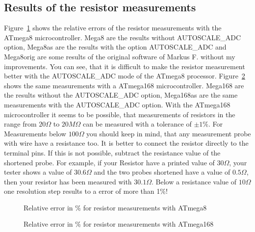 \subsection{Results of the resistor measurements}
Figure~\ref{fig:mega8res} shows the relative errors of the resistor measurements with the
ATmega8 microcontroller. Mega8 are the results without AUTOSCALE\_ADC option,
Mega8as are the results with the option AUTOSCALE\_ADC and
Mega8orig are some results of the original software of Markus F. without my improvements.
You can see, that it is difficult to make the resistor measurement better with the AUTOSCALE\_ADC mode
of the ATmega8 processor.
Figure~\ref{fig:mega168res} shows the same measurements with a ATmega168 microcontroller.
Mega168 are the results without the AUTOSCALE\_ADC option, Mega168as are the same
measurements with the AUTOSCALE\_ADC option.
With the ATmega168 microcontroller it seems to be possible, that measurements of resistors
in the range from \(20\Omega\) to \(20M\Omega\) can be measured with a tolerance of \(\pm1\%\).
For Measurements below \(100\Omega\) you should keep in mind, that any measurement probe with
wire have a resistance too. It is better to connect the resistor directly to the terminal pins.
If this is not possible, subtract the resistance value of the shortened probe.
For example, if your Resistor have a printed value of \(30\Omega\), your tester shows a value of \(30.6\Omega\)
and the two probes shortened have a value of \(0.5\Omega\), then your resistor has been measured
with \(30.1\Omega\).
Below a resistance value of \(10\Omega\) one resolution step results to a error of more than 1\%!

\begin{figure}[H]
\centering

\caption{Relative error in \% for resistor measurements with ATmega8 }
\label{fig:mega8res}
\end{figure}

\begin{figure}[H]
\centering

\caption{Relative error in \% for resistor measurements with ATmega168 }
\label{fig:mega168res}
\end{figure}

